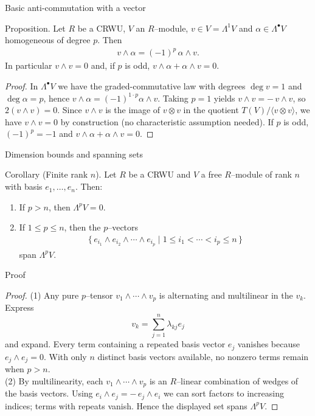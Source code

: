 \begin{frame}{Basic anti-commutation with a vector}
\begin{block}{Proposition.}
Let $R$ be a CRWU, $V$ an $R$–module, $v\in V=\Lambda^1V$ and $\alpha\in\Lambda^\bullet V$ homogeneous of degree $p$. Then
\begin{align*}
v\wedge\alpha = (-1)^p\,\alpha\wedge v.
\end{align*}
In particular $v\wedge v=0$ and, if $p$ is odd, $v\wedge\alpha+\alpha\wedge v=0$.
\end{block}
\vspace{-0.2cm}
\begin{proof}
In $\Lambda^\bullet V$ we have the graded-commutative law with degrees $\deg v=1$ and $\deg\alpha=p$, hence $v\wedge\alpha=(-1)^{1\cdot p}\alpha\wedge v$. Taking $p=1$ yields $v\wedge v=-\,v\wedge v$, so $2(v\wedge v)=0$. Since $v\wedge v$ is the image of $v\otimes v$ in the quotient $T(V)/\langle v\otimes v\rangle$, we have $v\wedge v=0$ by construction (no characteristic assumption needed). If $p$ is odd, $(-1)^p=-1$ and $v\wedge\alpha+\alpha\wedge v=0$.
\end{proof}
\end{frame}

\begin{frame}{Dimension bounds and spanning sets}
\begin{block}{Corollary (Finite rank $n$).}
Let $R$ be a CRWU and $V$ a free $R$–module of rank $n$ with basis $e_1,\dots,e_n$. Then:
\begin{enumerate}
\item If $p>n$, then $\Lambda^p V=0$.
\item If $1\le p\le n$, then the $p$–vectors
\begin{align*}
\{\, e_{i_1}\wedge e_{i_2}\wedge\cdots\wedge e_{i_p}\mid 1\le i_1<\cdots<i_p\le n \,\}
\end{align*}
span $\Lambda^p V$.
\end{enumerate}
\end{block}
\end{frame}

\begin{frame}{Proof}
\begin{proof}
(1) Any pure $p$–tensor $v_1\wedge\cdots\wedge v_p$ is alternating and multilinear in the $v_k$. Express $$v_k=\sum_{j=1}^n \lambda_{kj}e_j$$ and expand. Every term containing a repeated basis vector $e_j$ vanishes because $e_j\wedge e_j=0$. With only $n$ distinct basis vectors available, no nonzero terms remain when $p>n$.\\

(2) By multilinearity, each $v_1\wedge\cdots\wedge v_p$ is an $R$–linear combination of wedges of the basis vectors. Using $e_i\wedge e_j=-\,e_j\wedge e_i$ we can sort factors to increasing indices; terms with repeats vanish. Hence the displayed set spans $\Lambda^pV$.
\end{proof}
\end{frame}


